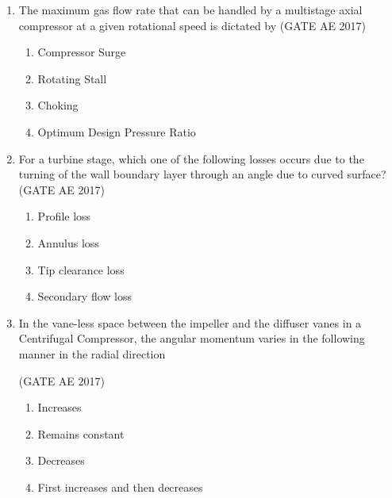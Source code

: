 \documentclass[journal,12pt,onecolumn]{IEEEtran}
\theoremstyle{remark}
\begin{document}
\begin{flushleft}
\begin{enumerate}
\begin{multicols}{2}
\begin{enumerate}
\item Cryogenic Rocket
\item Solid Propellant Rocket
\item Liquid Propellant Rocket
\item SCRAM Jet
\end{enumerate}
\end{multicols}

\item The maximum gas flow rate that can be handled by a multistage axial compressor at a given rotational speed is dictated by 
\hfill (GATE AE 2017)

\begin{multicols}{2}
\begin{enumerate}
\item Compressor Surge
\item Rotating Stall
\item Choking
\item Optimum Design Pressure Ratio
\end{enumerate}
\end{multicols}

\item For a turbine stage, which one of the following losses occurs due to the turning of the wall boundary layer through an angle due to curved surface? 
\hfill (GATE AE 2017)

\begin{multicols}{2}
\begin{enumerate}
\item Profile loss
\item Annulus loss
\item Tip clearance loss
\item Secondary flow loss
\end{enumerate}
\end{multicols}

\item In the vane-less space between the impeller and the diffuser vanes in a Centrifugal Compressor, the angular momentum varies in the following manner in the radial direction  

\hfill (GATE AE 2017)

\begin{multicols}{2}
\begin{enumerate}
\item Increases
\item Remains constant
\item Decreases
\item First increases and then decreases
\end{enumerate}
\end{multicols}


\end{enumerate}
\end{flushleft}
\end{document}
